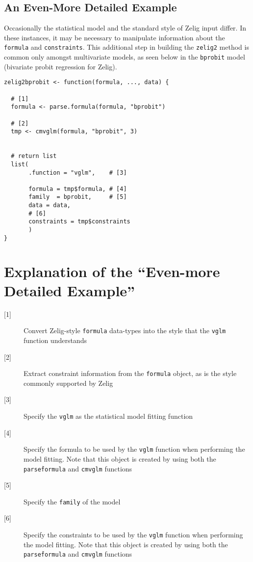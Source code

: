 \documentclass{article}
\newcommand{\code}[1]{{\tt #1}}
\begin{document}
\subsection{An Even-More Detailed Example}

{\noindent}Occasionally the statistical model and the standard style of Zelig input differ. In these instances, it may be necessary to manipulate information about the \code{formula} and \code{constraints}. This additional step in building the \code{zelig2} method is common only amongst multivariate models, as seen below in the \code{bprobit} model (bivariate probit regression for Zelig).

\begin{verbatim}
zelig2bprobit <- function(formula, ..., data) {

  # [1]
  formula <- parse.formula(formula, "bprobit")
  
  # [2]
  tmp <- cmvglm(formula, "bprobit", 3)

  
  # return list
  list(
       .function = "vglm",    # [3]
       
       formula = tmp$formula, # [4]
       family  = bprobit,     # [5]
       data = data,
       # [6]
       constraints = tmp$constraints
       )
}
\end{verbatim}

\section{Explanation of the ``Even-more Detailed Example''}

\begin{description}
	\item[{[1]}] Convert Zelig-style \code{formula} data-types into the style that the \code{vglm} function understands
	\item[{[2]}] Extract constraint information from the \code{formula} object, as is the style commonly supported by Zelig
	\item[{[3]}] Specify the \code{vglm} as the statistical model fitting function
	\item[{[4]}] Specify the formula to be used by the \code{vglm} function when performing the model fitting. Note that this object is created by using both the \code{parse\.formula} and \code{cmvglm} functions 
	\item[{[5]}] Specify the \code{family} of the model
	\item[{[6]}] Specify the constraints to be used by the \code{vglm} function when performing the model fitting. Note that this object is created by using both the \code{parse\.formula} and \code{cmvglm} functions
\end{description}
\end{document}
